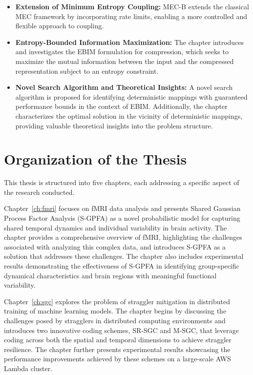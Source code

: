 \begin{itemize}
    \item \textbf{Extension of Minimum Entropy Coupling:} MEC-B extends the classical MEC framework by incorporating rate limits, enabling a more controlled and flexible approach to coupling.
    \item \textbf{Entropy-Bounded Information Maximization:} The chapter introduces and investigates the EBIM formulation for compression, which seeks to maximize the mutual information between the input and the compressed representation subject to an entropy constraint.
    \item \textbf{Novel Search Algorithm and Theoretical Insights:}  A novel search algorithm is proposed for identifying deterministic mappings with guaranteed performance bounds in the context of EBIM. Additionally, the chapter characterizes the optimal solution in the vicinity of deterministic mappings, providing valuable theoretical insights into the problem structure.
\end{itemize} 

\section{Organization of the Thesis}

This thesis is structured into five chapters, each addressing a specific aspect of the research conducted.

Chapter~\ref{ch:fmri} focuses on fMRI data analysis and presents Shared Gaussian Process Factor Analysis (S-GPFA) as a novel probabilistic model for capturing shared temporal dynamics and individual variability in brain activity. The chapter provides a comprehensive overview of fMRI, highlighting the challenges associated with analyzing this complex data, and introduces S-GPFA as a solution that addresses these challenges. The chapter also includes experimental results demonstrating the effectiveness of S-GPFA in identifying group-specific dynamical characteristics and brain regions with meaningful functional variability.

Chapter~\ref{ch:sgc} explores the problem of straggler mitigation in distributed training of machine learning models. The chapter begins by discussing the challenges posed by stragglers in distributed computing environments and introduces two innovative coding schemes, SR-SGC and M-SGC, that leverage coding across both the spatial and temporal dimensions to achieve straggler resilience. The chapter further presents experimental results showcasing the performance improvements achieved by these schemes on a large-scale AWS Lambda cluster.

